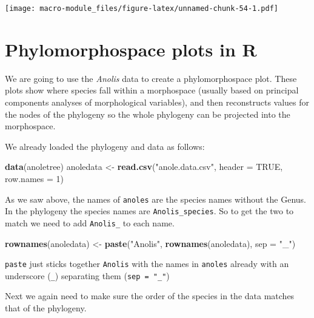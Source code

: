 \documentclass[]{book}
\newenvironment{Shaded}{\begin{snugshade}}{\end{snugshade}}
\newcommand{\KeywordTok}[1]{\textcolor[rgb]{0.13,0.29,0.53}{\textbf{{#1}}}}
\newcommand{\DataTypeTok}[1]{\textcolor[rgb]{0.13,0.29,0.53}{{#1}}}
\newcommand{\DecValTok}[1]{\textcolor[rgb]{0.00,0.00,0.81}{{#1}}}
\newcommand{\StringTok}[1]{\textcolor[rgb]{0.31,0.60,0.02}{{#1}}}
\newcommand{\OtherTok}[1]{\textcolor[rgb]{0.56,0.35,0.01}{{#1}}}
\newcommand{\NormalTok}[1]{{#1}}
\theoremstyle{definition}
\theoremstyle{definition}
\theoremstyle{definition}
\theoremstyle{remark}
\begin{document}
\texttt{[image: macro-module\_files/figure-latex/unnamed-chunk-54-1.pdf]}

\section{Phylomorphospace plots in R}\label{phylomorphospace-plots-in-r}

We are going to use the \emph{Anolis} data to create a phylomorphospace
plot. These plots show where species fall within a morphospace (usually
based on principal components analyses of morphological variables), and
then reconstructs values for the nodes of the phylogeny so the whole
phylogeny can be projected into the morphospace.

We already loaded the phylogeny and data as follows:

\begin{Shaded}
\begin{Highlighting}[]
\KeywordTok{data}\NormalTok{(anoletree)}
\NormalTok{anoledata <-}\StringTok{ }\KeywordTok{read.csv}\NormalTok{(}\StringTok{"anole.data.csv"}\NormalTok{, }\DataTypeTok{header =} \OtherTok{TRUE}\NormalTok{, }\DataTypeTok{row.names =} \DecValTok{1}\NormalTok{)}
\end{Highlighting}
\end{Shaded}

As we saw above, the names of \texttt{anoles} are the species names
without the Genus. In the phylogeny the species names are
\texttt{Anolis\_species}. So to get the two to match we need to add
\texttt{Anolis\_} to each name.

\begin{Shaded}
\begin{Highlighting}[]
\KeywordTok{rownames}\NormalTok{(anoledata) <-}\StringTok{ }\KeywordTok{paste}\NormalTok{(}\StringTok{"Anolis"}\NormalTok{, }\KeywordTok{rownames}\NormalTok{(anoledata), }\DataTypeTok{sep =} \StringTok{"_"}\NormalTok{)}
\end{Highlighting}
\end{Shaded}

\texttt{paste} just sticks together \texttt{Anolis} with the names in
\texttt{anoles} already with an underscore (\texttt{\_}) separating them
(\texttt{sep\ =\ "\_"})

Next we again need to make sure the order of the species in the data
matches that of the phylogeny.

\begin{Shaded}
\end{Shaded}
\end{document}
